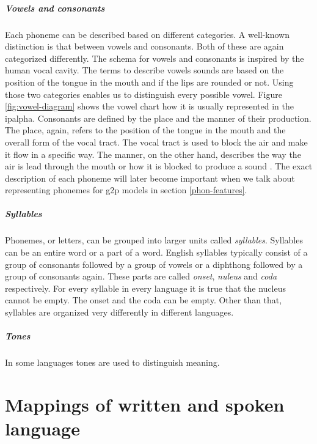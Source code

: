 \subparagraph{Vowels and consonants} Each phoneme can be described based on different categories. A well-known distinction is that between vowels and consonants. Both of these are again categorized differently. The schema for vowels and consonants is inspired by the human vocal cavity. The terms to describe vowels sounds are based on the position of the tongue in the mouth and if the lips are rounded or not. Using those two categories enables us to distinguish every possible vowel. Figure \ref{fig:vowel-diagram} shows the vowel chart how it is usually represented in the \ac{ipalpha}. Consonants are defined by the place and the manner of their production. The place, again, refers to the position of the tongue in the mouth and the overall form of the vocal tract. The vocal tract is used to block the air and make it flow in a specific way. The manner, on the other hand, describes the way the air is lead through the mouth or how it is blocked to produce a sound \citep{phonetics-video}. The exact description of each phoneme will later become important when we talk about representing phonemes for \ac{g2p} models in section \ref{phon-features}. 


\subparagraph{Syllables} Phonemes, or letters, can be grouped into larger units called \textit{syllables}. Syllables can be an entire word or a part of a word. English syllables typically consist of a group of consonants followed by a group of vowels or a diphthong followed by a group of consonants again. These parts are called \textit{onset}, \textit{nuleus} and \textit{coda} respectively.  For every syllable in every language it is true that the nucleus cannot be empty. The onset and the coda can be empty. Other than that, syllables are organized very differently in different languages. \citep{Intro.2007}

\subparagraph{Tones} In some languages tones are used to distinguish meaning. 


\section{Mappings of written and spoken language}
\label{writing-sys}

